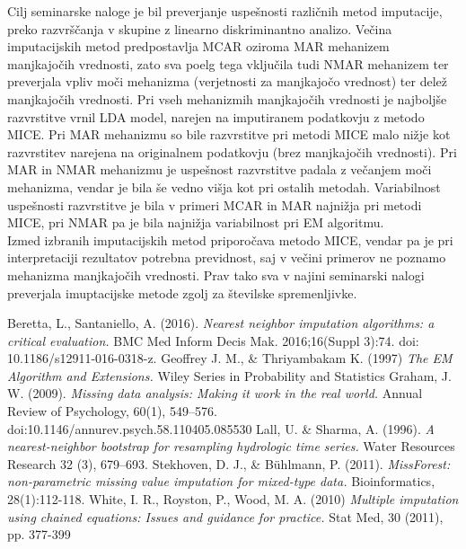 \documentclass[12pt,a4paper]{article}
\begin{document}
Cilj seminarske naloge je bil preverjanje uspešnosti različnih metod imputacije, preko razvrščanja v skupine z linearno diskriminantno analizo. Večina imputacijskih metod predpostavlja MCAR oziroma MAR mehanizem manjkajočih vrednosti, zato sva poelg tega vključila tudi NMAR mehanizem ter preverjala vpliv moči mehanizma (verjetnosti za manjkajočo vrednost) ter delež manjkajočih vrednosti. Pri vseh mehanizmih manjkajočih vrednosti je najboljše razvrstitve vrnil LDA model, narejen na imputiranem podatkovju z metodo MICE. Pri MAR mehanizmu so bile razvrstitve pri metodi MICE malo nižje kot razvrstitev narejena na originalnem podatkovju (brez manjkajočih vrednosti). Pri MAR in NMAR mehanizmu je uspešnost razvrstitve padala z večanjem moči mehanizma, vendar je bila še vedno višja kot pri ostalih metodah. Variabilnost uspešnosti razvrstitve je bila v primeri MCAR in MAR najnižja pri metodi MICE, pri NMAR pa je bila najnižja variabilnost pri EM algoritmu.\\
Izmed izbranih imputacijskih metod priporočava metodo MICE, vendar pa je pri interpretaciji rezultatov potrebna previdnost, saj v večini primerov ne poznamo mehanizma manjkajočih vrednosti. Prav tako sva v najini seminarski nalogi preverjala imuptacijske metode zgolj za številske spremenljivke.

    
 

\newpage
\begin{thebibliography}{9}
Beretta, L., Santaniello, A. (2016).
\textit{Nearest neighbor imputation algorithms: a critical evaluation.}
BMC Med Inform Decis Mak. 2016;16(Suppl 3):74. doi: 10.1186/s12911-016-0318-z.
Geoffrey J. M., \& Thriyambakam K. (1997) 
\textit{The EM Algorithm and Extensions.} 
Wiley Series in Probability and Statistics
Graham, J. W. (2009). 
\textit{Missing data analysis: Making it work in the real world.} 
Annual Review of Psychology, 60(1), 549–576. doi:10.1146/annurev.psych.58.110405.085530 
Lall, U. \& Sharma, A. (1996).
\textit{A nearest-neighbor bootstrap for resampling hydrologic time series.}
Water Resources Research 32 (3), 679–693.
Stekhoven, D. J., \& Bühlmann, P. (2011).
\textit{MissForest: non-parametric missing value imputation for mixed-type data.}
Bioinformatics, 28(1):112-118.
White, I. R., Royston, P., Wood, M. A. (2010)
\textit{Multiple imputation using chained equations: Issues and guidance for practice.}
Stat Med, 30 (2011), pp. 377-399

\end{thebibliography}
\end{document}
